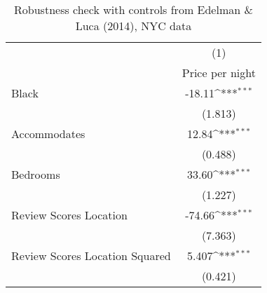 {
\def\sym#1{\ifmmode^{#1}\else\(^{#1}\)\fi}
\begin{longtable}{l*{1}{c}}
\caption{Robustness check with controls from Edelman \& Luca (2014), NYC data}\\
\hline\hline\endfirsthead\hline\endhead\hline\endfoot\endlastfoot
                    &\multicolumn{1}{c}{(1)}\\
                    &\multicolumn{1}{c}{Price per night}\\
\hline
Black               &      -18.11\sym{***}\\
                    &     (1.813)         \\
Accommodates        &       12.84\sym{***}\\
                    &     (0.488)         \\
Bedrooms            &       33.60\sym{***}\\
                    &     (1.227)         \\
Review Scores Location&      -74.66\sym{***}\\
                    &     (7.363)         \\
Review Scores Location Squared           &       5.407\sym{***}\\
                    &     (0.421)         \\


\end{longtable}}
